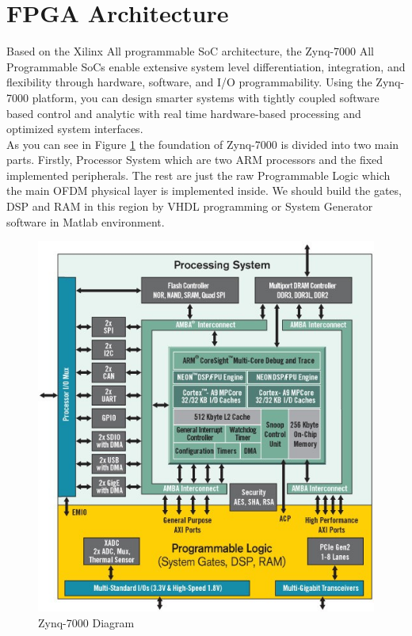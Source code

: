 \section{FPGA Architecture}
\label{fpga_arch}
Based on the Xilinx All programmable SoC architecture, the Zynq-7000 All Programmable SoCs \cite{zynq} enable extensive system level differentiation, integration, and flexibility through hardware, software, and I/O programmability. Using the Zynq-7000 platform, you can design smarter systems with tightly coupled software based control and analytic with real time hardware-based processing and optimized system interfaces.\\
As you can see in Figure \ref{fig:zynq_inside} the foundation of Zynq-7000 is divided into two main parts. Firstly, Processor System which are two ARM processors and the fixed implemented peripherals. The rest are just the raw Programmable Logic which the main OFDM physical layer is implemented inside. We should build the gates, DSP and RAM in this region by VHDL programming or System Generator software in Matlab environment.\\

\begin{figure}
\centering
\includegraphics[width=12cm]{content/fig/zynq_inside.JPG}
\caption{Zynq-7000 Diagram}
\label{fig:zynq_inside}
\end{figure}


